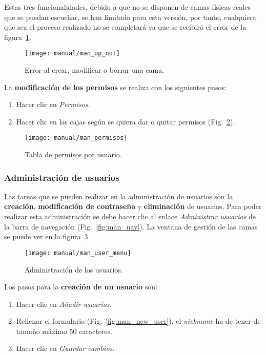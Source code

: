 Estas tres funcionalidades, debido a que no se disponen de camas físicas reales que se puedan escuchar, se han limitado para esta versión, por tanto, cualquiera que sea el proceso realizado no se completará ya que se recibirá el error de la figura~\ref{fig:man_error_no_dis}.

\begin{figure}
	\centering
	\texttt{[image: manual/man\_op\_not]}
	\caption{Error al crear, modificar o borrar una cama.}
	\label{fig:man_error_no_dis}
\end{figure}

La \textbf{modificación de los permisos} se realiza con los siguientes pasos:
\begin{enumerate}
	\item Hacer clic en \textit{Permisos}.
	\item Hacer clic en las cajas según se quiera dar o quitar permisos (Fig.~\ref{fig:man_perm}).
\end{enumerate}

\begin{figure}
	\centering
	\texttt{[image: manual/man\_permisos]}
	\caption{Tabla de permisos por usuario.}
	\label{fig:man_perm}
\end{figure}

\subsubsection{Administración de usuarios}

Las tareas que se pueden realizar en la administración de usuarios son la \textbf{creación}, \textbf{modificación de contraseña} y \textbf{eliminación} de usuarios. Para poder realizar esta administración se debe hacer clic al enlace \textit{Administrar usuarios} de la barra de navegación (Fig.~\ref{fig:man_nav}). La ventana de gestión de las camas se puede ver en la figura~\ref{fig:man_menu_usuario}

\begin{figure}
	\centering
	\texttt{[image: manual/man\_user\_menu]}
	\caption{Administración de los usuarios.}
	\label{fig:man_menu_usuario}
\end{figure}

Los pasos para la \textbf{creación de un usuario} son:
\begin{enumerate}
	\item Hacer clic en \textit{Añadir usuarios}.
	\item Rellenar el formulario (Fig.~\ref{fig:man_new_user}), el \textit{nickname} ha de tener de tamaño máximo 50 caracteres.
	\item Hacer clic en \textit{Guardar cambios}.
\end{enumerate}

